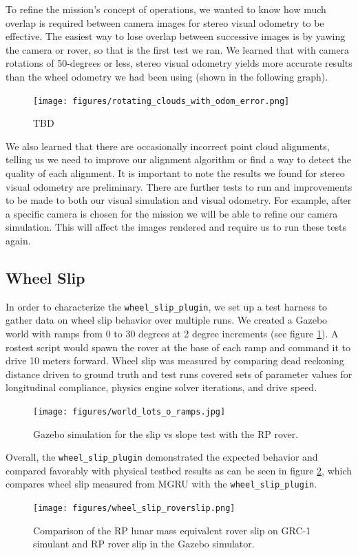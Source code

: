\documentclass[twocolumn,letterpaper]{IEEEAerospaceCLS}  %
\begin{document}
To refine the mission's concept of operations, we wanted to know how much overlap is required between camera images for stereo visual odometry to be effective. The easiest way to lose overlap between successive images is by yawing the camera or rover, so that is the first test we ran. We learned that with camera rotations of 50-degrees or less, stereo visual odometry yields more accurate results than the wheel odometry we had been using (shown in the following graph).
\begin{figure}[h!]
	\texttt{[image: figures/rotating\_clouds\_with\_odom\_error.png]}
    \caption{TBD}
\end{figure}

We also learned that there are occasionally incorrect point cloud alignments, telling us we need to improve our alignment algorithm or find a way to detect the quality of each alignment. It is important to note the results we found for stereo visual odometry are preliminary. There are further tests to run and improvements to be made to both our visual simulation and visual odometry. For example, after a specific camera is chosen for the mission we will be able to refine our camera simulation. This will affect the images rendered and require us to run these tests again.

\subsection{Wheel Slip}
In order to characterize the \texttt{wheel\_slip\_plugin}, we set up a test harness to gather data on wheel slip behavior over multiple runs. We created a Gazebo world with ramps from 0 to 30 degrees at 2 degree increments (see figure \ref{fig:simulationramps}). A rostest script would spawn the rover at the base of each ramp and command it to drive 10 meters forward. Wheel slip was measured by comparing dead reckoning distance driven to ground truth and test runs covered sets of parameter values for longitudinal compliance, physics engine solver iterations, and drive speed. 
\begin{figure}[h!]
	\texttt{[image: figures/world\_lots\_o\_ramps.jpg]}
   	\caption{Gazebo simulation for the slip vs slope test with the RP rover.}
    \label{fig:simulationramps}
\end{figure}
Overall, the \texttt{wheel\_slip\_plugin} demonstrated the expected behavior and compared favorably with physical testbed results as can be seen in figure \ref{fig:wheelsliptuningchart}, which compares wheel slip measured from MGRU with the  \texttt{wheel\_slip\_plugin}. 
\begin{figure}[h!]
	\texttt{[image: figures/wheel\_slip\_roverslip.png]}
   	\caption{Comparison of the RP lunar mass equivalent rover slip on GRC-1 simulant and RP rover slip in the Gazebo simulator.}
    \label{fig:wheelsliptuningchart}
\end{figure}
\end{document}
